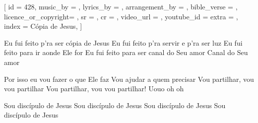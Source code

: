 [
    id                  = {428},
    music_by            = {},
    lyrics_by           = {},
    arrangement_by      = {},
    bible_verse         = {},
    licence_or_copyright= {},
    sr                  = {},
    cr                  = {},
    video_url           = {}, %
    youtube_id          = {}  %
    extra               = {},
    index               = {Cópia de Jesus},
]

\beginverse
Eu fui feito p’ra ser cópia de Jesus
Eu fui feito p’ra servir e p’ra ser luz
Eu fui feito para ir aonde Ele for
Eu fui feito para ser canal do Seu amor 
Canal do Seu amor
\endverse

\beginchorus
Por isso eu vou fazer o que Ele faz
Vou ajudar a quem precisar
Vou partilhar, vou vou partilhar
Vou partilhar, vou vou partilhar! Uouo oh oh
\endchorus

\beginverse
Sou discípulo de Jesus 
Sou discípulo de Jesus 
Sou discípulo de Jesus 
Sou discípulo de Jesus
\endverse


\endsong
